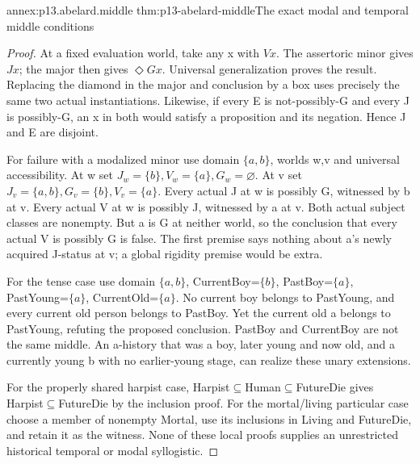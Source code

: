 \begin{annexitem}{annex:p13.abelard.middle}
 {thm:p13-abelard-middle}{The exact modal and temporal middle conditions}
\begin{proof}
At a fixed evaluation world, take any x with \(Vx\).
The assertoric minor gives \(Jx\); the major then gives
\(\Diamond Gx\). Universal generalization proves the result.
Replacing the diamond in the major and conclusion by
a box uses precisely the same two actual instantiations.
Likewise, if every E is not-possibly-G and every J is
possibly-G, an x in both would satisfy a proposition
and its negation. Hence J and E are disjoint.

For failure with a modalized minor use domain \(\{a,b\}\),
worlds w,v and universal accessibility.
At w set \(J_w=\{b\},V_w=\{a\},G_w=\varnothing\).
At v set \(J_v=\{a,b\},G_v=\{b\},V_v=\{a\}\).
Every actual J at w is possibly G, witnessed by b at v.
Every actual V at w is possibly J, witnessed by a at v.
Both actual subject classes are nonempty.
But a is G at neither world, so the conclusion that
every actual V is possibly G is false.
The first premise says nothing about a's newly acquired
J-status at v; a global rigidity premise would be extra.

For the tense case use domain \(\{a,b\}\),
CurrentBoy=\(\{b\}\), PastBoy=\(\{a\}\),
PastYoung=\(\{a\}\), CurrentOld=\(\{a\}\).
No current boy belongs to PastYoung, and every current
old person belongs to PastBoy. Yet the current old a
belongs to PastYoung, refuting the proposed conclusion.
PastBoy and CurrentBoy are not the same middle.
An a-history that was a boy, later young and now old,
and a currently young b with no earlier-young stage,
can realize these unary extensions.

For the properly shared harpist case,
Harpist\(\subseteq\)Human\(\subseteq\)FutureDie
gives Harpist\(\subseteq\)FutureDie by the inclusion proof.
For the mortal/living particular case choose a member
of nonempty Mortal, use its inclusions in Living and
FutureDie, and retain it as the witness.
None of these local proofs supplies an unrestricted
historical temporal or modal syllogistic.
\end{proof}
\end{annexitem}

